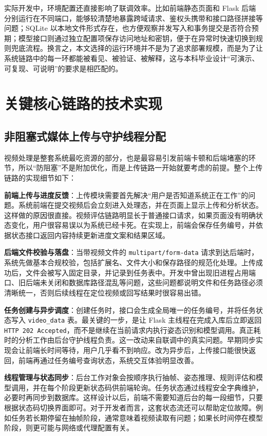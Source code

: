 实际开发中，环境配置还直接影响了联调效率。比如前端静态页面和 Flask 后端分别运行在不同端口，能够较清楚地暴露跨域请求、鉴权头携带和接口路径拼接等问题；SQLite 以本地文件形式存在，也方便观察并发写入和事务提交是否符合预期；模型接口则通过独立配置项保存访问地址和密钥，便于在异常时快速切换到规则兜底流程。换言之，本文选择的运行环境并不是为了追求部署规模，而是为了让系统链路中的每一环都能被看见、被验证、被解释，这与本科毕业设计“可演示、可复现、可说明”的要求是相匹配的。

\section{关键核心链路的技术实现}

\subsection{非阻塞式媒体上传与守护线程分配}
视频处理是整套系统最吃资源的部分，也是最容易引发前端卡顿和后端堵塞的环节，所以“防阻塞”不是附加优化，而是上传链路一开始就要考虑的前提。整个上传链路的实现细节如下：

\textbf{前端上传与进度反馈}：上传模块需要首先解决“用户是否知道系统正在工作”的问题。系统前端在提交视频后会立刻进入处理态，并在页面上显示上传和分析状态。这样做的原因很直接。视频评估链路明显长于普通接口请求，如果页面没有明确状态变化，用户很容易误以为系统已经卡死。在实现上，前端会保存任务编号，并依据状态接口返回内容持续更新进度文案和结果区域。

\textbf{后端文件校验与落盘}：当带视频文件的 \texttt{multipart/form-data} 请求到达后端时，系统先做基本合规校验，包括扩展名、文件大小和保存路径的规范化处理。上传成功后，文件会被写入固定目录，并记录到任务表中。开发中曾出现旧进程占用端口、旧后端未关闭和数据库路径混乱等问题，这些问题都说明文件和任务路径必须清晰统一，否则后续线程在定位视频或回写结果时很容易出错。

\textbf{任务创建与异步调度}：创建任务时，接口会生成全局唯一的任务编号，并将任务状态写入 \texttt{video\_data} 表。最关键的一步，是让 Flask 主线程在完成入库后立即返回 \texttt{HTTP 202 Accepted}，而不是继续在当前请求内执行姿态识别和模型调用。真正耗时的分析工作由后台守护线程负责。这一改动来自联调中的真实问题。早期同步实现会让前端长时间等待，用户几乎看不到响应。改为异步后，上传接口能很快返回，前端再通过任务编号查询状态，系统交互体验明显改善。

\textbf{线程管理与状态同步}：后台工作对象会按顺序执行抽帧、姿态推理、规则评估和模型调用，并在每个阶段更新状态码供前端轮询。任务状态通过线程安全字典维护，必要时再同步到数据库。这样设计以后，前端不需要知道后台的每一段细节，只要根据状态码切换界面即可。对于开发者而言，这套状态流还可以帮助定位故障。例如任务若长期停留在抽帧阶段，通常意味着视频读取有问题；如果长时间停在模型阶段，则更可能与网络或代理配置有关。

